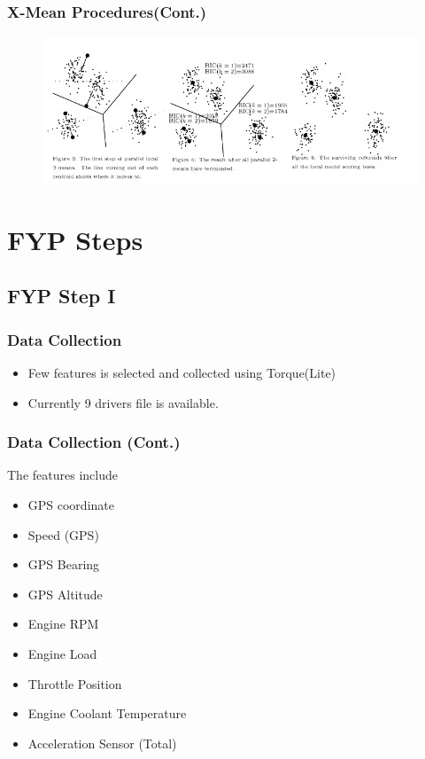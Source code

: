\documentclass{beamer}
\begin{document}
\begin{frame}
\frametitle{X-Mean Procedures(Cont.)}
\begin{figure}[hbt!]\centering
\includegraphics[scale=0.4]{image/xmean2}
\end{figure}
\end{frame}

\section{FYP Steps}
\subsection{FYP Step I}
\begin{frame}
\frametitle{Data Collection}
\begin{itemize}
\item Few features is selected and collected using Torque(Lite)
\item Currently 9 drivers file is available.
\end{itemize}
\end{frame}

\begin{frame}
\frametitle{Data Collection (Cont.)}
The features include
\begin{itemize}
\item GPS coordinate
\item Speed (GPS)
\item GPS Bearing
\item GPS Altitude
\item Engine RPM
\item Engine Load
\item Throttle Position
\item Engine Coolant Temperature
\item Acceleration Sensor (Total)
\end{itemize}
\end{frame}
\end{document}
